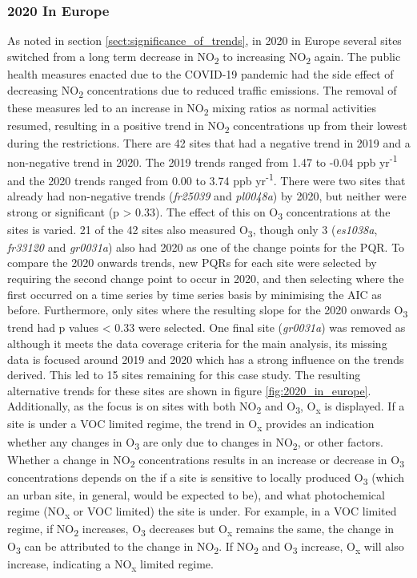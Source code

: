 \documentclass[journal abbreviation, manuscript]{copernicus}
\begin{document}
\subsubsection{2020 In Europe} \label{sect:2020_in_europe}
As noted in section \ref{sect:significance_of_trends}, in 2020 in Europe several sites switched from a long term decrease in NO\textsubscript{2} to increasing NO\textsubscript{2} again. The public health measures enacted due to the COVID-19 pandemic had the side effect of decreasing NO\textsubscript{2} concentrations due to reduced traffic emissions. The removal of these measures led to an increase in NO\textsubscript{2} mixing ratios as normal activities resumed, resulting in a positive trend in NO\textsubscript{2} concentrations up from their lowest during the restrictions. There are 42 sites that had a negative trend in 2019 and a non-negative trend in 2020. The 2019 trends ranged from 1.47 to -0.04 ppb yr\textsuperscript{-1} and the 2020 trends ranged from 0.00 to 3.74 ppb yr\textsuperscript{-1}. There were two sites that already had non-negative trends (\textit{fr25039} and \textit{pl0048a}) by 2020, but neither were strong or significant (p > 0.33). 
The effect of this on O\textsubscript{3} concentrations at the sites is varied.  21 of the 42 sites also measured O\textsubscript{3}, though only 3 (\textit{es1038a}, \textit{fr33120} and \textit{gr0031a}) also had 2020 as one of the change points for the PQR. To compare the 2020 onwards trends, new PQRs for each site were selected by requiring the second change point to occur in 2020, and then selecting where the first occurred on a time series by time series basis by minimising the AIC as before. Furthermore, only sites where the resulting slope for the 2020 onwards O\textsubscript{3} trend had p values < 0.33 were selected. One final site (\textit{gr0031a}) was removed as although it meets the data coverage criteria for the main analysis, its missing data is focused around 2019 and 2020 which has a strong influence on the trends derived. This led to 15 sites remaining for this case study. 
The resulting alternative trends for these sites are shown in figure \ref{fig:2020_in_europe}. Additionally, as the focus is on sites with both NO\textsubscript{2} and O\textsubscript{3}, O\textsubscript{x} is displayed. If a site is under a VOC limited regime, the trend in O\textsubscript{x} provides an indication whether any changes in O\textsubscript{3} are only due to changes in NO\textsubscript{2}, or other factors. Whether a change in NO\textsubscript{2} concentrations results in an increase or decrease in O\textsubscript{3} concentrations depends on the if a site is sensitive to locally produced O\textsubscript{3} (which an urban site, in general, would be expected to be), and what photochemical regime (NO\textsubscript{x} or VOC limited) the site is under. For example, in a VOC limited regime, if NO\textsubscript{2} increases, O\textsubscript{3} decreases but O\textsubscript{x} remains the same, the change in O\textsubscript{3} can be attributed to the change in NO\textsubscript{2}. If NO\textsubscript{2} and O\textsubscript{3} increase, O\textsubscript{x} will also increase, indicating a NO\textsubscript{x} limited regime.
\end{document}
